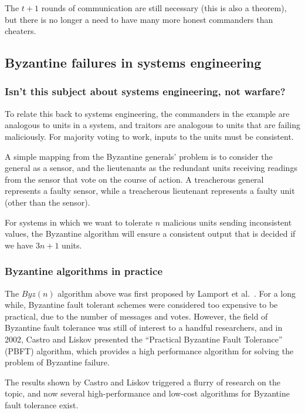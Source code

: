 The $t+1$ rounds of communication are still necessary (this is also a theorem), but there is no longer a need to have many more honest commanders than cheaters.

\subsection{Byzantine failures in systems engineering}

\subsubsection*{Isn't this subject about systems engineering, not warfare?}

To relate this back to systems engineering, the commanders in the example are analogous to units in a system, and traitors are analogous to units that are failing maliciously. For  majority voting to work, inputs to the units must be consistent.

A simple mapping from the Byzantine generals' problem is to consider the general as a sensor, and the lieutenants as the redundant units receiving readings from the sensor that vote on the course of action. A treacherous general represents a faulty sensor, while a treacherous lieutenant represents a faulty unit (other than the sensor).

For systems in which we want to tolerate \(n\) malicious units sending inconsistent values, the Byzantine algorithm will ensure a consistent output that is decided if we have \(3n + 1\) units.

\subsubsection*{Byzantine algorithms in practice}

The \(Byz(n)\) algorithm above was first proposed by Lamport et al.\ \cite{lamport82}. For a long while, Byzantine fault tolerant schemes were considered too expensive to be practical, due to the number of messages and votes. However, the field of Byzantine fault tolerance was still of interest to a handful researchers, and in 2002, Castro and Liskov \cite{castro02} presented the ``Practical Byzantine Fault Tolerance'' (PBFT) algorithm, which provides a high performance algorithm for solving the problem of Byzantine failure.

The results shown by Castro and Liskov triggered a flurry of research on the topic, and now several high-performance and low-cost algorithms for Byzantine fault tolerance exist.

